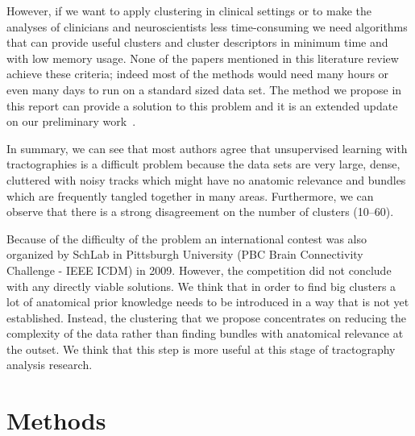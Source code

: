 \documentclass[preprint,authoryear,a4paper,10pt,onecolumn]{elsarticle}
\begin{document}
However, if we want to apply clustering in clinical settings or to make
the analyses of clinicians and neuroscientists less time-consuming we need
algorithms that can provide useful clusters and cluster descriptors in
minimum time and with low memory usage. None of the papers mentioned in
this literature review achieve these criteria; indeed most of the
methods would need many hours or even many days to run on a standard
sized data set. The method we propose in this report can provide a
solution to this problem and it is an extended update on our
preliminary work~\citep{EGMB10}.


In summary, we can see that most authors agree that unsupervised
learning with tractographies is a difficult problem because the data
sets are very large, dense, cluttered with noisy tracks which might have
no anatomic relevance and bundles which are frequently tangled together
in many areas. Furthermore, we can observe that there is a strong
disagreement on the number of clusters (\numrange{10}{60}).

Because of the difficulty of the problem an international contest was
also organized by SchLab in Pittsburgh University (PBC Brain
Connectivity Challenge - IEEE ICDM) in 2009. However, the competition
did not conclude with any directly viable solutions. We think that in
order to find big clusters a lot of anatomical prior knowledge needs to
be introduced in a way that is not yet established. Instead, the
clustering that we propose concentrates on reducing the complexity of
the data rather than finding bundles with anatomical relevance at the
outset. We think that this step is more useful at this stage of
tractography analysis research.

\section{Methods}


\end{document}
